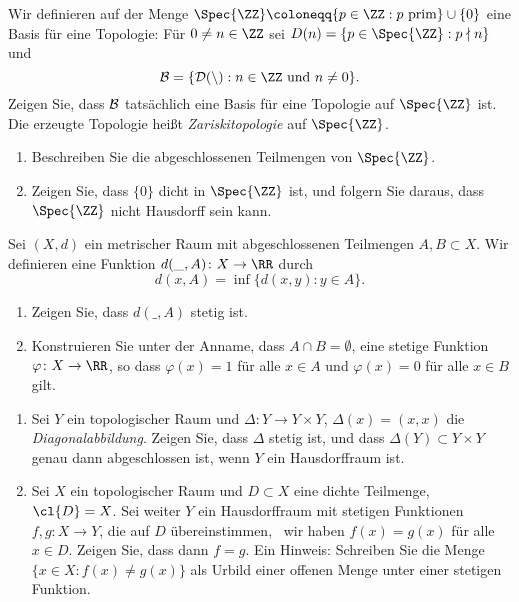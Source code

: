 

\setcounter{Sheet}{3}



\maketitle
\begin{exercise}
Wir definieren auf der Menge $\Spec{\ZZ} \coloneqq \{p\in\ZZ : \textnormal{$p$
prim}\}\cup \{0\}$ eine Basis für eine Topologie: Für $0\neq n\in\ZZ$
sei $D(n) = \{p\in\Spec{\ZZ} : p \nmid n\}$ und
\[
\cal B = \{ D(n) : \textnormal{$n\in\ZZ$ und $n\neq 0$}\}.
\]
Zeigen Sie, dass $\cal B$ tatsächlich eine Basis für eine Topologie auf
$\Spec{\ZZ}$ ist. Die erzeugte Topologie heißt \emph{Zariskitopologie}
auf $\Spec{\ZZ}$.
\begin{enumerate}
\item Beschreiben Sie die abgeschlossenen Teilmengen von $\Spec{\ZZ}$.
\item Zeigen Sie, dass $\{0\}$ dicht in $\Spec{\ZZ}$ ist, und folgern Sie daraus, dass
$\Spec{\ZZ}$ nicht Hausdorff sein kann.
\end{enumerate}
\end{exercise}
\begin{exercise}
Sei $(X,d)$ ein metrischer Raum mit abgeschlossenen Teilmengen $A,B\subset X$.
Wir definieren eine Funktion $d(\_,A)\colon X\to\RR$ durch
\[
d(x,A) = \inf\{ d(x,y) : y\in A\}.
\]
\begin{enumerate}
\item Zeigen Sie, dass $d(\_,A)$ stetig ist.
\item Konstruieren Sie unter der Anname, dass $A\cap B = \emptyset$, eine stetige Funktion $\varphi\colon
X\to \RR$, so dass $\varphi(x) = 1$ für alle $x\in A$ und $\varphi(x) = 0$ für
alle $x\in B$ gilt.
\end{enumerate}
\end{exercise}
\begin{exercise}\leavevmode
\begin{enumerate}
\item Sei $Y$ ein topologischer Raum und $\Delta\colon Y\to Y\times Y$, $\Delta (x) = (x,x)$ die
\emph{Diagonalabbildung}. Zeigen Sie, dass $\Delta$ stetig ist, und dass
$\Delta(Y)\subset Y\times Y$ genau dann abgeschlossen ist, wenn $Y$ ein
Hausdorffraum ist.
\item Sei $X$ ein topologischer Raum und $D\subset X$ eine dichte Teilmenge,
\ddh~$\cl{D} = X$. Sei weiter $Y$ ein Hausdorffraum mit stetigen Funktionen $f,g\colon X\to Y$, die auf
$D$ übereinstimmen, \ddh~wir haben $f(x) = g(x)$ für alle $x\in D$. Zeigen Sie,
dass dann $f = g$. {\footnotesize Ein Hinweis: Schreiben Sie die Menge $\{x\in X :
f(x)\neq g(x)\}$ als Urbild einer offenen Menge unter einer stetigen Funktion.}
\end{enumerate}
\end{exercise}

